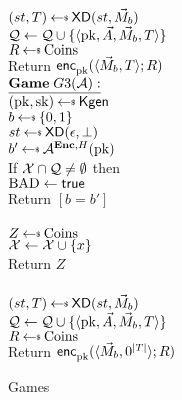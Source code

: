 \begin{figure}[tbhp]
\begin{center}
{\medskip
{}\\
$(st, T) \getsr \mdalg(st,\vmsg_b)$\\
$\mathcal{Q} \gets \mathcal{Q} \cup \{\langle \mathrm{pk},\vec{A},\vec{M}_b,T\rangle\}$\\
$R \getsr \mathrm{Coins}$\\
Return ${\mathsf{enc}}_{\mathrm{pk}}^{}(\langle \vec{M}_b,T\rangle; R)$\\
}
{
$\gamev{G3}{\advA}$\\
 $(\pk,\sk)\getsr\Kgen$\\
 $b \getsr \bits$ \\
 $st \getsr \mdalg(\epsilon,\bot)$\\
 $b' \getsr \advA^{\encOracle,H}(\pk)$\\
 If $\mathcal{X} \cap \mathcal{Q} \neq \emptyset$ then \\
\nudge $\mathrm{BAD}\gets\textsf{true}$\\
Return $[b=b']$\\ 

\medskip
{}\\
  $Z \getsr \mathrm{Coins}$\\
  $\mathcal{X} \gets \mathcal{X} \cup \{x\}$\\
  Return $Z$\\

\medskip
{}\\
$(st, T) \getsr \mdalg(st,\vmsg_b)$\\
$\mathcal{Q} \gets \mathcal{Q} \cup \{\langle \mathrm{pk},\vec{A},\vec{M}_b,T\rangle\}$\\
$R \getsr \mathrm{Coins}$\\
Return ${\mathsf{enc}}_{\mathrm{pk}}^{}(\langle \vec{M}_b,0^{|T|}\rangle; R)$\\
}
\caption{Games}
\label{fig:HtEgames}
\end{center}
\end{figure}

